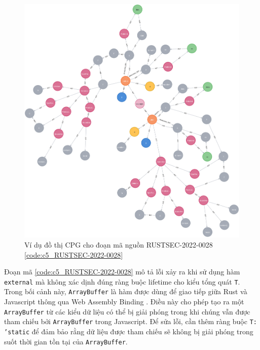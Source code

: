 \begin{figure}[H]
    \includegraphics[width=1\columnwidth]{figures/c5/c5_RUSTSEC-2022-0028.png}
    \centering
    \caption{Ví dụ đồ thị CPG cho đoạn mã nguồn RUSTSEC-2022-0028 \ref{code:c5_RUSTSEC-2022-0028}}
    \label{img:c5_RUSTSEC-2022-0028}
\end{figure}

Đoạn mã \ref{code:c5_RUSTSEC-2022-0028} mô tả lỗi xảy ra khi sử dụng hàm \texttt{external} mà không xác dịnh đúng ràng buộc lifetime cho kiểu tổng quát \texttt{T}.
Trong bối cảnh này, \texttt{ArrayBuffer} là hàm được dùng để giao tiếp giữa Rust và Javascript thông qua Web Assembly Binding \cite{ githubGitHubRustwasmwasmbindgen}.
Điều này cho phép tạo ra một \texttt{ArrayBuffer} từ các kiểu dữ liệu có thể bị giải phóng trong khi chúng vẫn được tham chiếu bởi \texttt{ArrayBuffer} trong Javascript.
Để sửa lỗi, cần thêm ràng buộc \texttt{T: 'static} để đảm bảo rằng dữ liệu được tham chiếu sẽ không bị giải phóng trong suốt thời gian tồn tại của \texttt{ArrayBuffer}.


